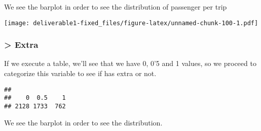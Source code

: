 \documentclass[
  18pt,
  a4paper]{article}
\newenvironment{Shaded}{\begin{snugshade}}{\end{snugshade}}
\newcommand{\DataTypeTok}[1]{\textcolor[rgb]{0.13,0.29,0.53}{#1}}
\newcommand{\DecValTok}[1]{\textcolor[rgb]{0.00,0.00,0.81}{#1}}
\newcommand{\KeywordTok}[1]{\textcolor[rgb]{0.13,0.29,0.53}{\textbf{#1}}}
\newcommand{\NormalTok}[1]{#1}
\newcommand{\OperatorTok}[1]{\textcolor[rgb]{0.81,0.36,0.00}{\textbf{#1}}}
\newcommand{\StringTok}[1]{\textcolor[rgb]{0.31,0.60,0.02}{#1}}
\begin{document}
We see the barplot in order to see the distribution of passenger per
trip

\begin{Shaded}
\end{Shaded}

\texttt{[image: deliverable1-fixed\_files/figure-latex/unnamed-chunk-100-1.pdf]}

\hypertarget{extra-1}{%
\subsubsection{\textgreater{} Extra}\label{extra-1}}

If we execute a table, we'll see that we have 0, 0'5 and 1 values, so we
proceed to categorize this variable to see if has extra or not.

\begin{Shaded}
\end{Shaded}

\begin{verbatim}
## 
##    0  0.5    1 
## 2128 1733  762
\end{verbatim}

\begin{Shaded}
\end{Shaded}

We see the barplot in order to see the distribution.
\end{document}
